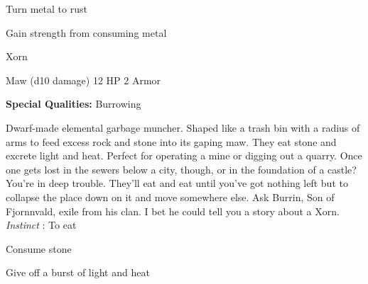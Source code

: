 \item Turn metal to rust

 
\item Gain strength from consuming metal


\stopitemize
 
\startMonsterName
Xorn	 
\stopMonsterName
 

Maw (d10 damage)	12 HP	2 Armor

 


 
\startMonsterQualities
{\bf Special Qualities:}  Burrowing
\stopMonsterQualities
 
\startMonsterDescription
Dwarf-made elemental garbage muncher. Shaped like a trash bin with a radius of arms to feed excess rock and stone into its gaping maw. They eat stone and excrete light and heat. Perfect for operating a mine or digging out a quarry. Once one gets lost in the sewers below a city, though, or in the foundation of a castle? You’re in deep trouble. They’ll eat and eat until you’ve got nothing left but to collapse the place down on it and move somewhere else. Ask Burrin, Son of Fjornnvald, exile from his clan. I bet he could tell you a story about a Xorn. {\em Instinct} : To eat
\stopMonsterDescription
 
\startitemize[1,packed]

\item Consume stone

 
\item Give off a burst of light and heat


\stopitemize
 






